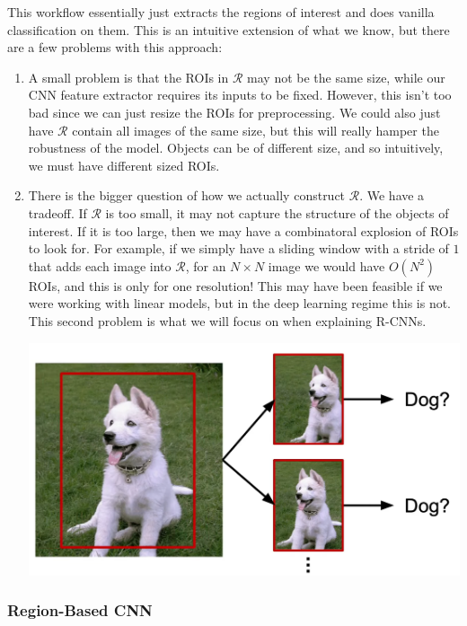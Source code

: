 \documentclass{article}
\theoremstyle{definition}
\theoremstyle{remark}
\theoremstyle{definition}
\begin{document}
    This workflow essentially just extracts the regions of interest and does vanilla classification on them. This is an intuitive extension of what we know, but there are a few problems with this approach: 
    \begin{enumerate}
      \item A small problem is that the ROIs in $\mathcal{R}$ may not be the same size, while our CNN feature extractor requires its inputs to be fixed. However, this isn't too bad since we can just resize the ROIs for preprocessing. We could also just have $\mathcal{R}$ contain all images of the same size, but this will really hamper the robustness of the model. Objects can be of different size, and so intuitively, we must have different sized ROIs. 

      \item There is the bigger question of how we actually construct $\mathcal{R}$. We have a tradeoff. If $\mathcal{R}$ is too small, it may not capture the structure of the objects of interest. If it is too large, then we may have a combinatoral explosion of ROIs to look for. For example, if we simply have a sliding window with a stride of $1$ that adds each image into $\mathcal{R}$, for an $N \times N$ image we would have $O(N^2)$ ROIs, and this is only for one resolution! This may have been feasible if we were working with linear models, but in the deep learning regime this is not. This second problem is what we will focus on when explaining R-CNNs. 
      
        \begin{center}
          \includegraphics[scale=0.3]{img/sliding_window.png}
        \end{center}
    \end{enumerate}

    \subsubsection{Region-Based CNN}
\end{document}
